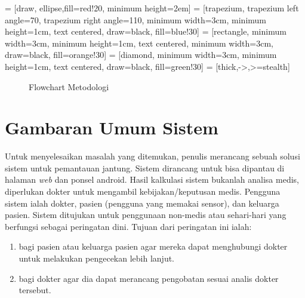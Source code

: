
\usetikzlibrary{positioning}
 = [draw, ellipse,fill=red!20, minimum height=2em]
 = [trapezium, trapezium left angle=70, trapezium right angle=110, minimum width=3cm, minimum height=1cm, text centered, draw=black, fill=blue!30]
 = [rectangle, minimum width=3cm, minimum height=1cm, text centered, minimum width=3cm, draw=black, fill=orange!30]
 = [diamond, minimum width=3cm, minimum height=1cm, text centered, draw=black, fill=green!30]
 = [thick,->,>=stealth]

\begin{figure}[H]
    \centering
    \caption{Flowchart Metodologi}
	\label{flow:fig_flow_method}
\end{figure}

\section{Gambaran Umum Sistem}
Untuk menyelesaikan masalah yang ditemukan, penulis merancang sebuah solusi sistem untuk pemantauan jantung. Sistem dirancang untuk bisa dipantau di halaman \textit{web} dan ponsel android. Hasil kalkulasi sistem bukanlah analisa medis, diperlukan dokter untuk mengambil kebijakan/keputusan medis. Pengguna sistem ialah dokter, pasien (pengguna yang memakai sensor), dan keluarga pasien. Sistem ditujukan untuk penggunaan non-medis atau sehari-hari yang berfungsi sebagai peringatan dini. Tujuan dari peringatan ini ialah:
\begin{enumerate}
	\item bagi pasien atau keluarga pasien agar mereka dapat menghubungi dokter untuk melakukan pengecekan lebih lanjut.
	\item bagi dokter agar dia dapat merancang pengobatan sesuai analis dokter tersebut.
\end{enumerate}

